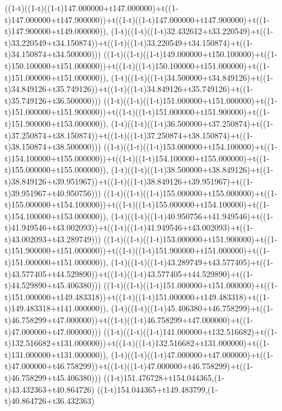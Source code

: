 ((1-t)((1-t)((1-t)147.000000+t147.000000)+t((1-t)147.000000+t147.900000))+t((1-t)((1-t)147.000000+t147.900000)+t((1-t)147.900000+t149.000000)),                                     (1-t)((1-t)((1-t)32.432612+t33.220549)+t((1-t)33.220549+t34.150874))+t((1-t)((1-t)33.220549+t34.150874)+t((1-t)34.150874+t34.500000)))
((1-t)((1-t)((1-t)149.000000+t150.100000)+t((1-t)150.100000+t151.000000))+t((1-t)((1-t)150.100000+t151.000000)+t((1-t)151.000000+t151.000000)),                                     (1-t)((1-t)((1-t)34.500000+t34.849126)+t((1-t)34.849126+t35.749126))+t((1-t)((1-t)34.849126+t35.749126)+t((1-t)35.749126+t36.500000)))
((1-t)((1-t)((1-t)151.000000+t151.000000)+t((1-t)151.000000+t151.900000))+t((1-t)((1-t)151.000000+t151.900000)+t((1-t)151.900000+t153.000000)),                                     (1-t)((1-t)((1-t)36.500000+t37.250874)+t((1-t)37.250874+t38.150874))+t((1-t)((1-t)37.250874+t38.150874)+t((1-t)38.150874+t38.500000)))
((1-t)((1-t)((1-t)153.000000+t154.100000)+t((1-t)154.100000+t155.000000))+t((1-t)((1-t)154.100000+t155.000000)+t((1-t)155.000000+t155.000000)),                                     (1-t)((1-t)((1-t)38.500000+t38.849126)+t((1-t)38.849126+t39.951967))+t((1-t)((1-t)38.849126+t39.951967)+t((1-t)39.951967+t40.950756)))
((1-t)((1-t)((1-t)155.000000+t155.000000)+t((1-t)155.000000+t154.100000))+t((1-t)((1-t)155.000000+t154.100000)+t((1-t)154.100000+t153.000000)),                                     (1-t)((1-t)((1-t)40.950756+t41.949546)+t((1-t)41.949546+t43.002093))+t((1-t)((1-t)41.949546+t43.002093)+t((1-t)43.002093+t43.289749)))
((1-t)((1-t)((1-t)153.000000+t151.900000)+t((1-t)151.900000+t151.000000))+t((1-t)((1-t)151.900000+t151.000000)+t((1-t)151.000000+t151.000000)),                                     (1-t)((1-t)((1-t)43.289749+t43.577405)+t((1-t)43.577405+t44.529890))+t((1-t)((1-t)43.577405+t44.529890)+t((1-t)44.529890+t45.406380)))
((1-t)((1-t)((1-t)151.000000+t151.000000)+t((1-t)151.000000+t149.483318))+t((1-t)((1-t)151.000000+t149.483318)+t((1-t)149.483318+t141.000000)),                                     (1-t)((1-t)((1-t)45.406380+t46.758299)+t((1-t)46.758299+t47.000000))+t((1-t)((1-t)46.758299+t47.000000)+t((1-t)47.000000+t47.000000)))
((1-t)((1-t)((1-t)141.000000+t132.516682)+t((1-t)132.516682+t131.000000))+t((1-t)((1-t)132.516682+t131.000000)+t((1-t)131.000000+t131.000000)),                                     (1-t)((1-t)((1-t)47.000000+t47.000000)+t((1-t)47.000000+t46.758299))+t((1-t)((1-t)47.000000+t46.758299)+t((1-t)46.758299+t45.406380)))
((1-t)151.476728+t154.044365,(1-t)43.432363+t40.864726)
((1-t)154.044365+t149.483799,(1-t)40.864726+t36.432363)
